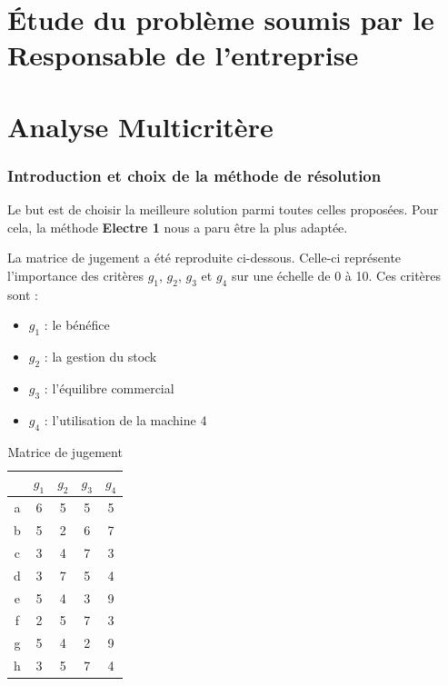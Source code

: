\documentclass[paper=a4, fontsize=11pt]{report}
\numberwithin{equation}{section}		%
\numberwithin{figure}{section}			%
\numberwithin{table}{section}				%
\begin{document}
\part{\'Etude du problème soumis par le Responsable de l'entreprise}



\part{Analyse Multicritère}

\section{Introduction et choix de la méthode de résolution}
Le but est de choisir la meilleure solution parmi toutes celles proposées. Pour cela, la méthode \textbf{Electre 1} nous a paru être la plus adaptée.

La matrice de jugement a été reproduite ci-dessous. Celle-ci représente l'importance des critères $g_1$, $g_2$, $g_3$ et $g_4$ sur une échelle de 0 à 10. Ces critères sont : 

\begin{multicols}{2}

\begin{itemize}
\item $g_1$ : le bénéfice
\item $g_2$ : la gestion du stock
\item $g_3$ : l'équilibre commercial
\item $g_4$ : l'utilisation de la machine 4
\end{itemize}


\begin{table}[H]
\begin{center}
\begin{tabular}{c|cccc}
 & $g_1$ & $g_2$ & $g_3$ & $g_4$ \\ 
\hline 
a & 6 & 5 & 5 & 5 \\ 
b & 5 & 2 & 6 & 7 \\ 
c & 3 & 4 & 7 & 3 \\ 
d & 3 & 7 & 5 & 4 \\ 
e & 5 & 4 & 3 & 9 \\ 
f & 2 & 5 & 7 & 3 \\ 
g & 5 & 4 & 2 & 9 \\ 
h & 3 & 5 & 7 & 4 \\ 
\end{tabular}
\caption{Matrice de jugement} 
\end{center}
\end{table}

\end{multicols}
\end{document}
